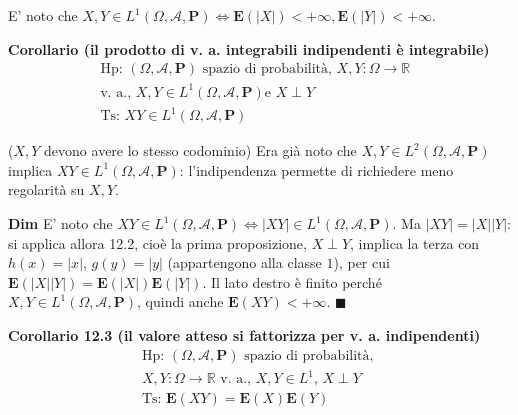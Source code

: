 \documentclass{article}
\begin{document}
E' noto che $X,Y\in L^{1}\left( \Omega ,\mathcal{A},\mathbf{P}\right)
\Longleftrightarrow \mathbf{E}\left( \left\vert X\right\vert \right)
<+\infty ,\mathbf{E}\left( \left\vert Y\right\vert \right) <+\infty $.

\textbf{Corollario (il prodotto di v. a. integrabili indipendenti \`{e}
integrabile)}%
\begin{gather*}
\text{Hp}\text{: }\left( \Omega ,\mathcal{A},\mathbf{P}\right) \text{ spazio
di probabilit\`{a}, }X,Y:\Omega \rightarrow 
\mathbb{R}
\text{ } \\
\text{v. a., }X,Y\in L^{1}\left( \Omega ,\mathcal{A},\mathbf{P}\right) \text{
e }X\perp Y \\
\text{Ts}\text{: }XY\in L^{1}\left( \Omega ,\mathcal{A},\mathbf{P}\right)
\end{gather*}

($X,Y$ devono avere lo stesso codominio) Era gi\`{a} noto che $X,Y\in
L^{2}\left( \Omega ,\mathcal{A},\mathbf{P}\right) $ implica $XY\in
L^{1}\left( \Omega ,\mathcal{A},\mathbf{P}\right) $: l'indipendenza permette
di richiedere meno regolarit\`{a} su $X,Y$.

\textbf{Dim} E' noto che $XY\in L^{1}\left( \Omega ,\mathcal{A},\mathbf{P}%
\right) \Longleftrightarrow \left\vert XY\right\vert \in L^{1}\left( \Omega ,%
\mathcal{A},\mathbf{P}\right) $. Ma $\left\vert XY\right\vert =\left\vert
X\right\vert \left\vert Y\right\vert $: si applica allora 12.2, cio\`{e} la
prima proposizione, $X\perp Y$, implica la terza con $h\left( x\right)
=\left\vert x\right\vert $, $g\left( y\right) =\left\vert y\right\vert $
(appartengono alla classe $1$), per cui $\mathbf{E}\left( \left\vert
X\right\vert \left\vert Y\right\vert \right) =\mathbf{E}\left( \left\vert
X\right\vert \right) \mathbf{E}\left( \left\vert Y\right\vert \right) $. Il
lato destro \`{e} finito perch\'{e} $X,Y\in L^{1}\left( \Omega ,\mathcal{A},%
\mathbf{P}\right) $, quindi anche $\mathbf{E}\left( XY\right) <+\infty $. $%
\blacksquare $

\textbf{Corollario 12.3 (il valore atteso si fattorizza per v. a.
indipendenti)}%
\begin{gather*}
\text{Hp}\text{: }\left( \Omega ,\mathcal{A},\mathbf{P}\right) \text{ spazio
di probabilit\`{a}, } \\
X,Y:\Omega \rightarrow 
\mathbb{R}
\text{ v. a., }X,Y\in L^{1}\text{, }X\perp Y \\
\text{Ts}\text{: }\mathbf{E}\left( XY\right) =\mathbf{E}\left( X\right) 
\mathbf{E}\left( Y\right)
\end{gather*}
\end{document}
